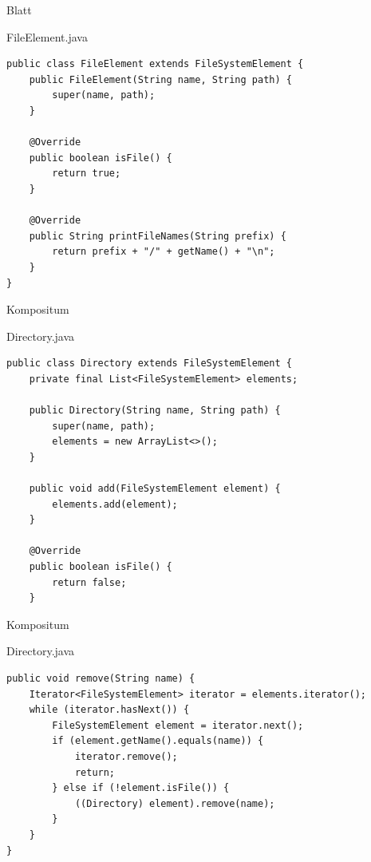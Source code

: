 \begin{frame}[fragile]{Blatt}
	\begin{exampleblock}{FileElement.java}
        \begin{lstlisting}
public class FileElement extends FileSystemElement {
    public FileElement(String name, String path) {
        super(name, path);
    }
    
    @Override
	public boolean isFile() {
        return true;
    }
    
    @Override
    public String printFileNames(String prefix) {
        return prefix + "/" + getName() + "\n";
    }
}
        \end{lstlisting}
 	\end{exampleblock}
\end{frame}

\begin{frame}[fragile]{Kompositum}
	\begin{exampleblock}{Directory.java}
        \begin{lstlisting}
public class Directory extends FileSystemElement {
    private final List<FileSystemElement> elements;

    public Directory(String name, String path) {
        super(name, path);
        elements = new ArrayList<>();
    }

    public void add(FileSystemElement element) {
        elements.add(element);
    }
    
    @Override
    public boolean isFile() {
        return false;
    }
        \end{lstlisting}
 	\end{exampleblock}
\end{frame}

\begin{frame}[fragile]{Kompositum}
	\begin{exampleblock}{Directory.java}
        \begin{lstlisting}
public void remove(String name) {
    Iterator<FileSystemElement> iterator = elements.iterator();
    while (iterator.hasNext()) {
        FileSystemElement element = iterator.next();
        if (element.getName().equals(name)) {
            iterator.remove();
            return;
        } else if (!element.isFile()) {
            ((Directory) element).remove(name);
        }
    }
}
        \end{lstlisting}
 	\end{exampleblock}
\end{frame}

